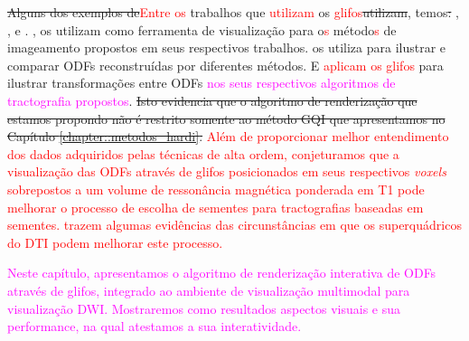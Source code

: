 \sout{Alguns dos exemplos de}\textcolor{red}{Entre os} trabalhos que \textcolor{red}{utilizam} os \textcolor{red}{glifos}\sout{utilizam}, temos\sout{:} ,  ,    e  . ,   os utilizam como ferramenta de visualização para o\textcolor{red}{s} método\textcolor{red}{s} de imageamento propostos em seus respectivos trabalhos.  os utiliza para ilustrar e comparar ODFs reconstruídas por diferentes métodos. E  \textcolor{red}{aplicam os glifos}  para ilustrar transformações entre ODFs \textcolor{magenta}{nos seus respectivos algoritmos de tractografia propostos}. \sout{Isto evidencia que o algoritmo de renderização que estamos propondo não é restrito somente ao método GQI que apresentamos no Capítulo \ref{chapter::metodos_hardi}.}
\textcolor{red}{Além de proporcionar melhor entendimento dos dados adquiridos pelas técnicas de alta ordem, conjeturamos que a visualização das ODFs através de glifos posicionados em seus respectivos \textit{voxels} sobrepostos a um volume de ressonância magnética ponderada em T1 pode melhorar o processo de escolha de sementes para tractografias baseadas em sementes.  trazem algumas evidências das circunstâncias em que os superquádricos do DTI podem melhorar este processo.}


\textcolor{magenta}{
Neste capítulo, apresentamos o algoritmo de renderização interativa de ODFs através de glifos, integrado ao ambiente de visualização multimodal para visualização DWI. Mostraremos como resultados aspectos visuais e sua performance, na qual atestamos a sua interatividade.
}

